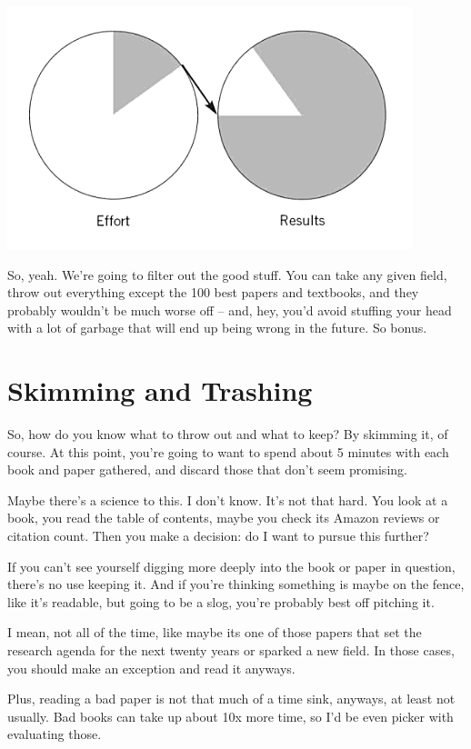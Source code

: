 \includegraphics[width=\textwidth]{graphics/pareto-principle}

So, yeah. We're going to filter out the good stuff. You can take any given
field, throw out everything except the 100 best papers and textbooks, and they
probably wouldn't be much worse off -- and, hey, you'd avoid stuffing your head
with a lot of garbage that will end up being wrong in the future. So bonus.

\section{Skimming and Trashing}

So, how do you know what to throw out and what to keep? By skimming it, of
course. At this point, you're going to want to spend about 5 minutes with each
book and paper gathered, and discard those that don't seem promising.

Maybe there's a science to this. I don't know. It's not that hard. You look at a
book, you read the table of contents, maybe you check its Amazon reviews or
citation count. Then you make a decision: do I want to pursue this further?

If you can't see yourself digging more deeply into the book or paper in
question, there's no use keeping it. And if you're thinking something is maybe on
the fence, like it's readable, but going to be a slog, you're probably best off
pitching it.

I mean, not all of the time, like maybe its one of those papers that set the research
agenda for the next twenty years or sparked a new field. In those cases, you
should make an exception and read it anyways.

Plus, reading a bad paper is not that much of a time sink, anyways, at least not
usually. Bad books can take up about 10x more time, so I'd be even picker with
evaluating those.


